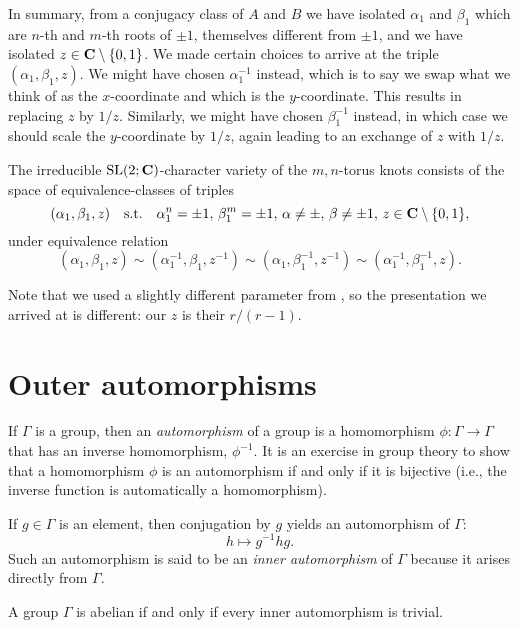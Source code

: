 \documentclass[11pt, oneside, usenames, dvipsnames, svgnames, table, final]{amsart}
\begin{document}
\begin{example}
  In summary, from a conjugacy class of $A$ and $B$ we have isolated $\alpha_1$ and $\beta_1$ which are $n$-th and
  $m$-th roots of $\pm 1$, themselves different from $\pm 1$, and we have isolated $z \in \mathbf{C} \setminus \{0,1\}$. We made
  certain choices to arrive at the triple $(\alpha_1, \beta_1, z )$. We might have chosen $\alpha_1^{-1}$ instead, which
  is to say we  swap what we think of as the $x$-coordinate and which is the $y$-coordinate. This results in replacing
  $z$ by $1/z$. Similarly, we might have chosen $\beta_1^{-1}$ instead, in which case we should scale the $y$-coordinate
  by $1/z$, again leading to an exchange of $z$ with $1/z$.

  The irreducible $\operatorname{SL}(2;\mathbf{C})$-character variety of the $m,n$-torus knots consists of the space of equivalence-classes of
  triples
  \[ (\alpha_1, \beta_1, z) \quad \text{s.t.} \quad\alpha_1^n = \pm 1, \, \beta_1^m = \pm 1, \, \alpha \neq \pm, \, \beta
    \neq \pm 1, \, z \in \mathbf{C} \setminus \{0,1\}, \]
  under equivalence relation
  \[ (\alpha_1, \beta_1, z)  \sim (\alpha_1^{-1}, \beta_1, z^{-1}) \sim (\alpha_1, \beta_1^{-1}, z^{-1})  \sim
    (\alpha_1^{-1}, \beta_1^{-1}, z).\]

  Note that we used a slightly different parameter from \cite{Munoz2009}, so the presentation we arrived at is
  different: our $z$ is their $r/(r-1)$.
\end{example}


\section{Outer automorphisms}
\label{sec:outer-automorphisms}

If $\Gamma$ is a group, then an \emph{automorphism} of a group is a homomorphism $\phi: \Gamma \to \Gamma$ that has an
inverse homomorphism, $\phi^{-1}$. It is an exercise in group theory to show that a homomorphism $\phi$ is an automorphism if and only
if it is bijective (i.e., the inverse function is automatically a homomorphism).

If $g \in \Gamma$ is an element, then conjugation by $g$ yields an automorphism of $\Gamma$:
\[ h \mapsto g^{-1} h g. \]
Such an automorphism is said to be an \emph{inner automorphism} of $\Gamma$ because it arises directly from $\Gamma$.

\begin{remark}
  A group $\Gamma$ is abelian if and only if every inner automorphism is trivial.
\end{remark}
\end{document}
